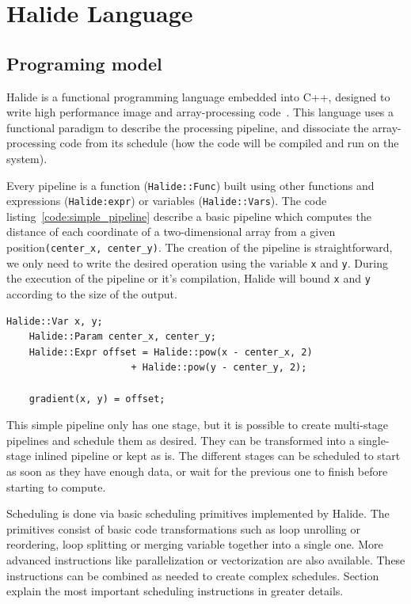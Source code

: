 \section{Halide Language}
	\subsection { Programing model}
		Halide is a functional programming language embedded into C++, designed to write high performance image and array-processing code~\cite{Web:Halide}. This language uses a functional paradigm to describe the processing pipeline, and dissociate the array-processing code from its schedule (how the code will be compiled and run on the system). 


		Every pipeline is a function (\texttt{Halide::Func}) built using other functions and expressions (\verb|Halide:expr|) or variables (\texttt{Halide::Vars}).
		The code listing~\ref{code:simple_pipeline} describe a basic pipeline which computes the distance of each coordinate of a two-dimensional array from a given position\texttt{(center\_x, center\_y)}. 
		The creation of the pipeline is straightforward, we only need to write the desired operation using the variable \verb|x| and \verb|y|. During the execution of the pipeline or it's compilation, Halide will bound \verb|x| and \verb|y| according to the size of the output.
\lstset{basicstyle=\ttfamily\footnotesize,breaklines=true,tabsize=2}
\begin{lstlisting}[caption={Simple Pipeline Example}, captionpos=b, label={code:simple_pipeline}]
	Halide::Var x, y;
	Halide::Param center_x, center_y;
	Halide::Expr offset = Halide::pow(x - center_x, 2) 
                      + Halide::pow(y - center_y, 2);

	gradient(x, y) = offset;
\end{lstlisting}

	This simple pipeline only has one stage, but it is possible to create multi-stage pipelines and schedule them as desired. They can be transformed into a single-stage inlined pipeline or kept as is.
	The different stages can be scheduled to start as soon as they have enough data, or wait for the previous one to finish before starting to compute.

	Scheduling is done via basic scheduling primitives implemented by Halide.
The primitives consist of basic code transformations such as loop unrolling or reordering, loop splitting or merging variable together into a single one. More advanced instructions like parallelization or vectorization are also available. These instructions can be combined as needed to create complex schedules.
Section ~ explain the most important scheduling instructions in greater details. 


